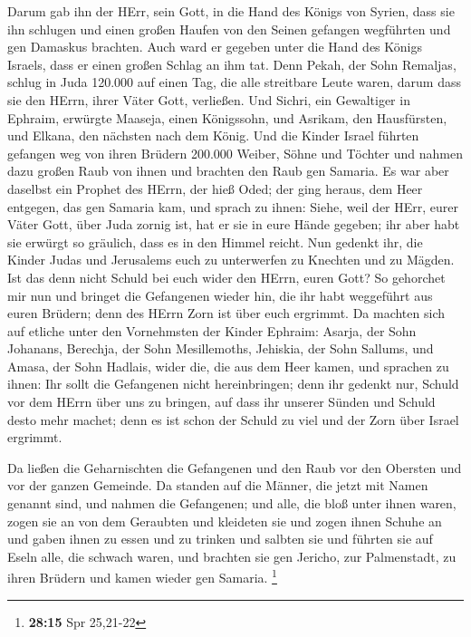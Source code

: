  Darum gab ihn der HErr, sein Gott, in die Hand des Königs
von Syrien, dass sie ihn schlugen und einen großen Haufen von den Seinen
gefangen wegführten und gen Damaskus brachten. Auch ward er gegeben
unter die Hand des Königs Israels, dass er einen großen Schlag an ihm
tat.  Denn Pekah, der Sohn Remaljas, schlug in Juda 120.000
auf einen Tag, die alle streitbare Leute waren, darum dass sie den
HErrn, ihrer Väter Gott, verließen.  Und Sichri, ein
Gewaltiger in Ephraim, erwürgte Maaseja, einen Königssohn, und Asrikam,
den Hausfürsten, und Elkana, den nächsten nach dem König. 
Und die Kinder Israel führten gefangen weg von ihren Brüdern 200.000
Weiber, Söhne und Töchter und nahmen dazu großen Raub von ihnen und
brachten den Raub gen Samaria.  Es war aber daselbst ein
Prophet des HErrn, der hieß Oded; der ging heraus, dem Heer entgegen,
das gen Samaria kam, und sprach zu ihnen: Siehe, weil der HErr, eurer
Väter Gott, über Juda zornig ist, hat er sie in eure Hände gegeben; ihr
aber habt sie erwürgt so gräulich, dass es in den Himmel reicht.
 Nun gedenkt ihr, die Kinder Judas und Jerusalems euch zu
unterwerfen zu Knechten und zu Mägden. Ist das denn nicht Schuld bei
euch wider den HErrn, euren Gott?  So gehorchet mir nun und
bringet die Gefangenen wieder hin, die ihr habt weggeführt aus euren
Brüdern; denn des HErrn Zorn ist über euch ergrimmt.  Da
machten sich auf etliche unter den Vornehmsten der Kinder Ephraim:
Asarja, der Sohn Johanans, Berechja, der Sohn Mesillemoths, Jehiskia,
der Sohn Sallums, und Amasa, der Sohn Hadlais, wider die, die aus dem
Heer kamen,  und sprachen zu ihnen: Ihr sollt die
Gefangenen nicht hereinbringen; denn ihr gedenkt nur, Schuld vor dem
HErrn über uns zu bringen, auf dass ihr unserer Sünden und Schuld desto
mehr machet; denn es ist schon der Schuld zu viel und der Zorn über
Israel ergrimmt.

 Da ließen die Geharnischten die Gefangenen und den Raub
vor den Obersten und vor der ganzen Gemeinde.  Da standen
auf die Männer, die jetzt mit Namen genannt sind, und nahmen die
Gefangenen; und alle, die bloß unter ihnen waren, zogen sie an von dem
Geraubten und kleideten sie und zogen ihnen Schuhe an und gaben ihnen zu
essen und zu trinken und salbten sie und führten sie auf Eseln alle, die
schwach waren, und brachten sie gen Jericho, zur Palmenstadt, zu ihren
Brüdern und kamen wieder gen Samaria. \footnote{\textbf{28:15} Spr
  25,21-22}

